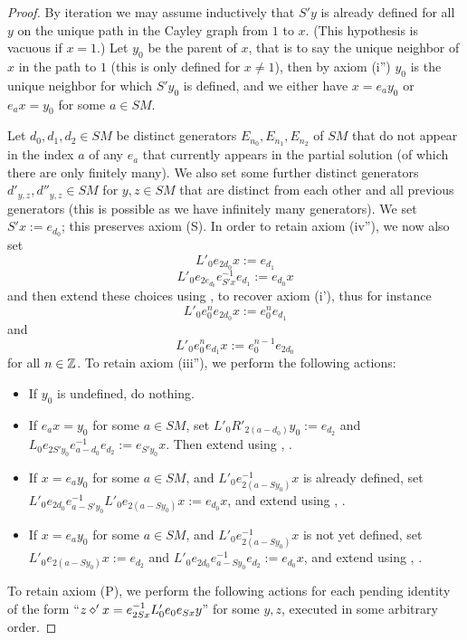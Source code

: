 \begin{proof} By iteration we may assume inductively that $S'y$ is already defined for all $y$ on the unique path in the Cayley graph from $1$ to $x$.  (This hypothesis is vacuous if $x=1$.)  Let $y_0$ be the parent of $x$, that is to say the unique neighbor of $x$ in the path to $1$ (this is only defined for $x \neq 1$), then by axiom (i'') $y_0$ is the unique neighbor for which $S'y_0$ is defined, and we either have $x = e_a y_0$ or $e_a x = y_0$ for some $a \in SM$.

Let $d_0, d_1, d_2 \in SM$ be distinct generators $E_{n_0}, E_{n_1}, E_{n_2}$ of $SM$ that do not appear in the index $a$ of any $e_a$ that currently appears in the partial solution (of which there are only finitely many).  We also set some further distinct generators $d'_{y,z}, d''_{y,z} \in SM$ for $y,z \in SM$ that are distinct from each other and all previous generators (this is possible as we have infinitely many generators).  We set $S'x := e_{d_0}$; this preserves axiom (S).  In order to retain axiom (iv''), we now also set
$$ L'_0 e_{2d_0} x := e_{d_1}$$
$$ L'_0 e_{2e_{d_0}} e_{S'x}^{-1} e_{d_1} := e_{d_0} x$$
and then extend these choices using ,  to recover axiom (i'), thus for instance
$$ L'_0 e_0^n e_{2d_0} x := e_0^n e_{d_1}$$
and
$$ L'_0 e_0^n e_{d_1} x := e_0^{n-1} e_{2d_0}$$
for all $n \in \mathbb{Z}$.  To retain axiom (iii''), we perform the following actions:
\begin{itemize}
\item If $y_0$ is undefined, do nothing.
\item If $e_a x = y_0$ for some $a \in SM$, set $L'_0 R'_{2(a-d_0)} y_0 := e_{d_2}$ and $L_0 e_{2S'y_0} e_{a-d_0}^{-1} e_{d_2} := e_{S'y_0} x$.  Then extend using , .
\item If $x = e_a y_0$ for some $a \in SM$, and $L'_0 e_{2(a-Sy_0)}^{-1} x$ is already defined, set $L'_0 e_{2d_0} e^{-1}_{a-S'y_0} L'_0 e_{2(a-Sy_0)} x :=e_{d_0}x$, and extend using , .
\item If $x = e_a y_0$ for some $a \in SM$, and $L'_0 e_{2(a-Sy_0)}^{-1} x$ is not yet defined, set $L'_0 e_{2(a-Sy_0)} x := e_{d_2}$ and $L'_0 e_{2d_0} e_{a-Sy_0}^{-1} e_{d_2} := e_{d_0} x$, and extend using , .
\end{itemize}
To retain axiom (P), we perform the following actions for each pending identity of the form ``$z \diamond' x = e_{2Sx}^{-1} L'_0 e_0 e_{Sx} y$'' for some $y,z$, executed in some arbitrary order.

\end{proof}
